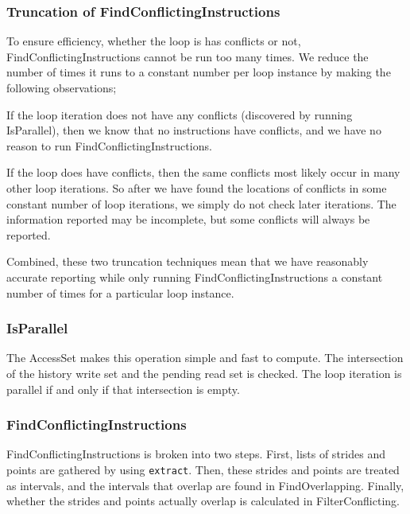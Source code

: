 \documentclass[12pt,twoside]{reedthesis}
\begin{document}
		
		\subsubsection{Truncation of FindConflictingInstructions}

			To ensure efficiency, whether the loop is has conflicts or not, FindConflictingInstructions cannot be run too many times. We reduce the number of times it runs to a constant number per loop instance by making the following observations; 
			
			If the loop iteration does not have any conflicts (discovered by running IsParallel), then we know that no instructions have conflicts, and we have no reason to run FindConflictingInstructions. 
			
			If the loop does have conflicts, then the same conflicts most likely occur in many other loop iterations. So after we have found the locations of conflicts in some constant number of loop iterations, we simply do not check later iterations. The information reported may be incomplete, but some conflicts will always be reported.%
			
			Combined, these two truncation techniques mean that we have reasonably accurate reporting while only running FindConflictingInstructions a constant number of times for a particular loop instance.
		
		\subsubsection{IsParallel}
		
			The AccessSet makes this operation simple and fast to compute. The intersection of the history write set and the pending read set is checked. The loop iteration is parallel if and only if that intersection is empty. 
			
		\subsubsection{FindConflictingInstructions}
		
			FindConflictingInstructions is broken into two steps. First, lists of strides and points are gathered by using \texttt{extract}. Then, these strides and points are treated as intervals, and the intervals that overlap are found in FindOverlapping. Finally, whether the strides and points actually overlap is calculated in FilterConflicting.
			
\end{document}
